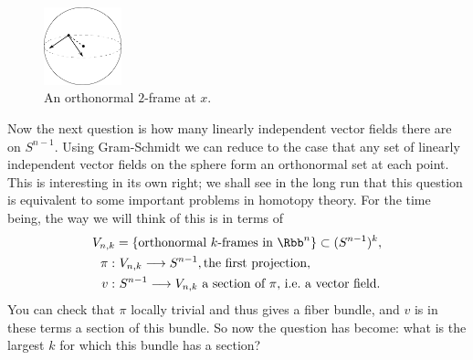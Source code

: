 \begin{figure}
\centering\includegraphics[width=0.2\textwidth]{figures/fig2.pdf}
\caption{\small An orthonormal $2$-frame at $x$.}
\end{figure}
Now the next question is how many linearly independent vector fields there are on $S^{n-1}$.  Using Gram-Schmidt we can reduce to the case that any set of linearly independent vector fields on the sphere form an orthonormal set at each point.  This is interesting in its own right; we shall see in the long run that this question is equivalent to some important problems in homotopy theory.  For the time being, the way we will think of this is in terms of
\begin{align*}
V_{n, k} & = \{\hbox{orthonormal $k$-frames in $\Rbb^n$}\} \subset (S^{n-1})^k, \\
\pi: &\,\, V_{n, k} \to S^{n-1}, \hbox{the first projection}, \\
v: &\,\, S^{n-1} \to V_{n, k}\hbox{ a section of $\pi$, i.e.\ a vector field}.
\end{align*}
You can check that $\pi$ locally trivial and thus gives a fiber bundle, and $v$ is in these terms a section of this bundle.  So now the question has become: what is the largest $k$ for which this bundle has a section?

